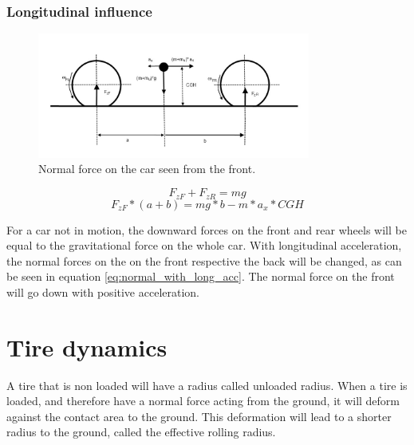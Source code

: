 \subsubsection{Longitudinal influence}

\begin{figure}[h]
	\centering
	\includegraphics[width=0.8\textwidth]{Pictures/normal_force_longitudinal}
	\caption{Normal force on the car seen from the front.}
	\label{normal_force_longitudinal}
\end{figure}
\begin{equation} \label{eq:normal_2}
	F_{zF} + F_{zR} = mg
\end{equation}
\begin{equation} \label{eq:normal_with_long_acc}
	F_{zF}*(a+b) = mg*b - m*a_{x}*CGH
\end{equation}

For a car not in motion, the downward forces on the front and rear wheels will be equal to the gravitational force on the whole car. With longitudinal acceleration, the normal forces on the on the front respective the back will be changed, as can be seen in equation \ref{eq:normal_with_long_acc}. The normal force on the front will go down with positive acceleration. 

\section{Tire dynamics}

A tire that is non loaded will have a radius called unloaded radius. When a tire is loaded, and therefore have a normal force acting from the ground, it will deform against the contact area to the ground. This deformation will lead to a shorter radius to the ground, called the effective rolling radius. 

